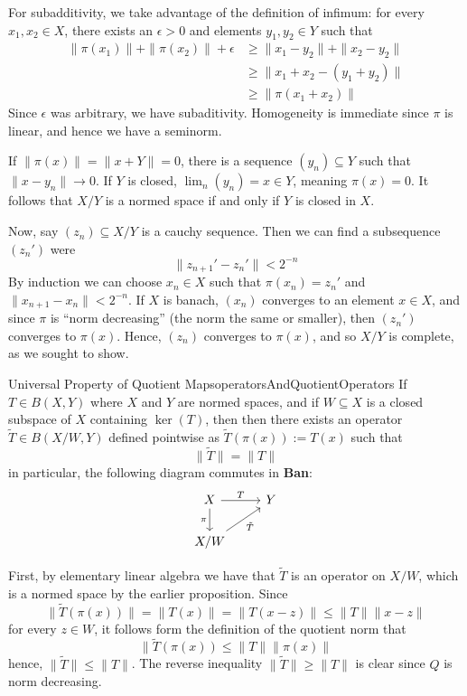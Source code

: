 \documentclass[oneside]{book}
\newcommand{\sse}{\subseteq}
\renewcommand{\bf}[1]{\textbf{#1}}
\newcommand{\rw}{\rightarrow}
\begin{document}
\begin{Proof}
	For subadditivity, we take advantage of the definition of infimum: for every $x_1, x_2 \in X$, there exists an
	$\epsilon > 0$ and elements $y_1, y_2 \in Y$ such that
	\begin{align*}
		\|\pi(x_1)\| + \|\pi(x_2)\| + \epsilon &\ge \|x_1 - y_2\| + \|x_2 - y_2\|\\
											   &\ge \|x_1 + x_2 - (y_1 + y_2)\|\\
		&\ge \|\pi(x_1 + x_2)\|
	\end{align*}
	Since $\epsilon$ was arbitrary, we have subaditivity. Homogeneity is immediate since $\pi$ is linear, and
	hence we have a seminorm.

	If $\|\pi(x)\| = \|x + Y\| = 0$, there is a sequence $(y_n) \sse Y$ such that $\|x- y_n\| \rw 0$. If $Y$ is
	closed, $\lim_n (y_n) = x \in Y$, meaning $\pi(x) = 0$. It follows that $X/Y$ is a normed space if and only if $Y$
	is closed in $X$.


	Now, say $(z_n) \sse X/Y$ is a cauchy sequence. Then we can find a subsequence $(z_n')$ were
	\[
		\|z_{n+1}' - z_n'\| < 2^{-n}
	\]
	By induction we can choose $x_n \in X$ such that $\pi(x_n) = z_n'$ and $\|x_{n+1} - x_n\| < 2^{-n}$. If $X$ is
	banach, $(x_n)$ converges to an element $x \in X$, and since $\pi$ is ``norm decreasing'' (the norm the same or
	smaller), then $(z_n')$ converges to $\pi(x)$. Hence, $(z_n)$ converges to $\pi(x)$, and so $X/Y$ is
	complete, as we sought to show.
\end{Proof}

\begin{prop}{Universal Property of Quotient Maps}{operatorsAndQuotientOperators}
	If $T \in B(X,Y)$ where $X$ and $Y$ are normed spaces, and if $W \sse X$ is a closed subspace of $X$
	containing $\ker (T)$, then then there exists an operator $\tilde{T} \in B(X/W, Y)$ defined pointwise as
	$\tilde{T}(\pi(x)) := T(x)$ such that
	\[
		\|\tilde{T}\| = \|T\|
	\]
	in particular, the following diagram commutes in \bf{Ban}:
	\[
\begin{tikzcd}
X \arrow[r, "T"] \arrow[d, "\pi"'] & Y \\
X/W \arrow[ru, "\tilde{T}"']       &
\end{tikzcd}
	\]
\end{prop}

\begin{Proof}
	First, by elementary linear algebra we have that $\tilde{T}$ is an operator on $X/W$, which is a normed space by
	the earlier proposition. Since
	\[
		\|\tilde{T}(\pi(x))\| = \|T(x)\| = \|T(x-z)\| \le \|T\|\|x-z\|
	\]
	for every $z \in W$, it follows form the definition of the quotient norm that
	\[
		\|\tilde{T}(\pi(x)) \le \|T\|\|\pi(x)\|
	\]
	hence, $\|\tilde{T}\| \le \|T\|$. The reverse inequality $\|\tilde{T}\| \ge \|T\|$ is clear since $Q$ is
	norm decreasing.
\end{Proof}
\end{document}

